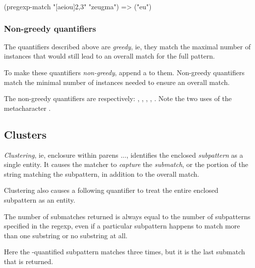 {{(pregexp-match "[aeiou]{2,3}" "zeugma")
=> ("eu")
}

\subsubsection{Non-greedy quantifiers}

The quantifiers described above are {\em greedy}, ie,
they match the  maximal number of instances that would
still lead to an overall match for the full pattern.


To make these quantifiers {\em non-greedy}, append
a  to them.  Non-greedy quantifiers match
the minimal number of instances needed to ensure an
overall match.


The non-greedy quantifiers are respectively:
, , , , .
Note the two uses of the metacharacter .

\subsection{Clusters}

{\em Clustering}, ie, enclosure within parens
\p{(}...\p{)}, identifies the enclosed {\em subpattern}
as a single entity.  It causes the matcher to {\em capture}
the {\em submatch}, or the portion of the string
matching the subpattern, in addition to the
overall match.


Clustering also causes a following quantifier to treat
the entire enclosed subpattern as an entity.


The number of submatches returned is always equal
to the number of subpatterns specified in the
regexp, even if a particular subpattern happens
to match more than one substring or no substring
at all.


\n Here the \p{*}-quantified subpattern matches three
times, but it is the last submatch that is returned.

}
